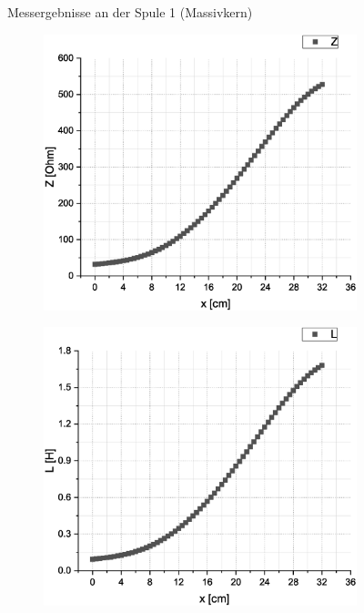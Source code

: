 \documentclass[10pt,a4paper]{article}
\begin{document}
\begin{flushleft}
\begin{itemize}
\begin{figure}[H]
\caption{Messergebnisse an der Spule 1 (Massivkern)}
\label{fig:messerg_spule1}
\end{figure}

\begin{figure}[H]
\centering
\begin{subfigure}[c]{.5\textwidth}
\centering
\includegraphics[scale=0.3]{Imped2}
\label{fig:l2_imped}
\end{subfigure}%
%
\begin{subfigure}[c]{.5\textwidth}
\centering
\includegraphics[scale=0.3]{Indukt2}
\label{fig:l2_ind}
\end{subfigure}%


\end{figure}
\end{itemize}
\end{flushleft}
\end{document}
